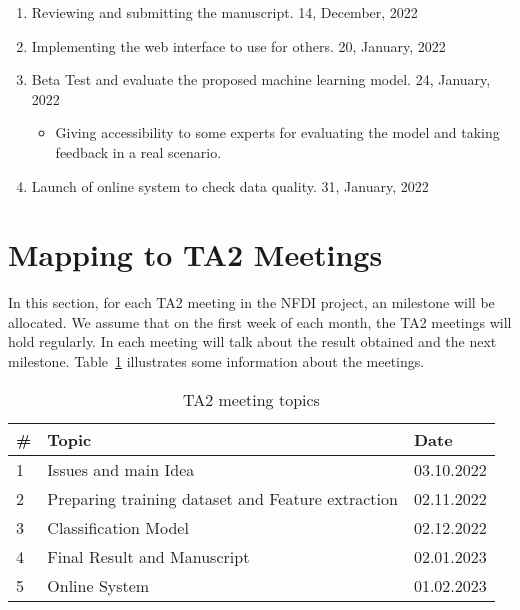 \documentclass[a4paper]{article}
\newcommand{\deadline}[1]{{\color{blue} \hfill{#1} }}
\begin{document}
\begin{enumerate}
\begin{itemize}
        \end{itemize}
        \item Reviewing and submitting the manuscript.\deadline{14, December, 2022}
        \item Implementing the web interface to use for others. \deadline{20, January, 2022}
        \item Beta Test and evaluate the proposed machine learning model. \deadline{24, January, 2022}
        \begin{itemize}
            \item Giving accessibility to some experts for evaluating the model and taking feedback in a real scenario.
        \end{itemize}
        \item Launch of online system to check data quality. \deadline{31, January, 2022}

    \end{enumerate}

    \section{Mapping to TA2 Meetings}\label{sec:ta2}
    In this section, for each TA2 meeting in the NFDI project, an milestone will be allocated.
    We assume that on the first week of each month, the TA2 meetings will hold regularly.
    In each meeting will talk about the result obtained and the next milestone.
    Table~\ref{tab:ta2} illustrates some information about the meetings.
    \begin{table}[h]\label{tab:ta2}
        \centering
        \caption{TA2 meeting topics}
        \begin{tabular}{lll}
            \# & Topic                                             & Date       \\ \hline
            1  & Issues and main Idea                              & 03.10.2022 \\
            2  & Preparing training dataset and Feature extraction & 02.11.2022 \\
            3  & Classification Model                              & 02.12.2022 \\
            4  & Final Result and Manuscript                       & 02.01.2023 \\
            5  & Online System                                     & 01.02.2023 \\ \hline
        \end{tabular}
    \end{table}

    
    
\end{document}

